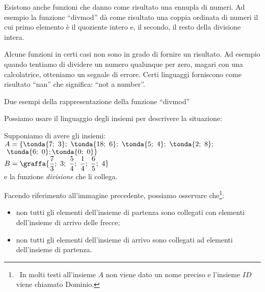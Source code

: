 Esistono anche funzioni che danno come risultato una ennupla di numeri. 
Ad esempio la funzione ``divmod'' dà come risultato una coppia ordinata 
di numeri il cui primo elemento è il quoziente intero e, il secondo, il resto 
della divisione intera. 

Alcune funzioni in certi casi non sono in grado di fornire un risultato. Ad 
esempio quando tentiamo di dividere un numero qualunque per zero, magari con 
una calcolatrice, otteniamo un segnale di errore. 
Certi linguaggi forniscono come risultato ``nan'' che significa: ``not a 
number''.

\begin{center}
Due esempi della rappresentazione della funzione ``divmod''\\[1em]
\begin{inaccessibleblock}
\grafidivmod %
\end{inaccessibleblock}
\end{center}

Possiamo usare il linguaggio degli insiemi per descrivere la situazione:

\begin{minipage}{.38\textwidth}
Supponiamo di avere gli insiemi:\\ [.5em]
\(A=\{\tonda{7;~3};~\tonda{18;~6};~\tonda{5;~4};~\tonda{2;~8};\)\\
\hspace*{7.8mm}\(~\tonda{6;~0}; \tonda{0;~0}\}\)\\ [.5em]
\(B=\graffa{\dfrac{7}{3};~3;~\dfrac{5}{4};~\dfrac{1}{4};~\dfrac{6}{5};~4}\)\\ 
[.5em]
e la funzione \emph{divisione} che li collega.
\end{minipage}
\begin{minipage}{.60\textwidth}
\begin{center}
\begin{inaccessibleblock}
\funzdivmod %
\end{inaccessibleblock}
\end{center}
\end{minipage}

Facendo riferimento all'immagine precedente, possiamo osservare 
che\footnote{~In molti testi all'insieme \(A\) non viene dato un nome preciso 
e l'insieme \(ID\) viene chiamato Dominio.}:
\begin{itemize} [noitemsep]
\item non tutti gli elementi dell'insieme di partenza sono collegati con 
elementi dell'insieme di arrivo delle frecce;
\item non tutti gli elementi dell'insieme di arrivo sono collegati ad 
elementi dell'insieme di partenza.
\end{itemize}

